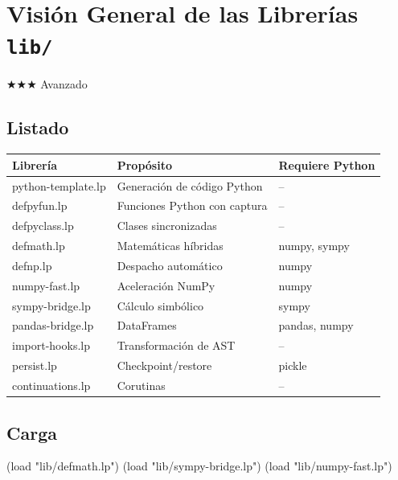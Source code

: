 \chapter{Visión General de las Librerías \texttt{lib/}}
\label{chap:libs}
{\huge$\bigstar$}{\huge$\bigstar$}{\huge$\bigstar$} Avanzado

\section{Listado}
\begin{center}
\begin{tabular}{lll}
\toprule
Librería & Propósito & Requiere Python \\
\midrule
python-template.lp & Generación de código Python & -- \\
defpyfun.lp & Funciones Python con captura & -- \\
defpyclass.lp & Clases sincronizadas & -- \\
defmath.lp & Matemáticas híbridas & numpy, sympy \\
defnp.lp & Despacho automático & numpy \\
numpy-fast.lp & Aceleración NumPy & numpy \\
sympy-bridge.lp & Cálculo simbólico & sympy \\
pandas-bridge.lp & DataFrames & pandas, numpy \\
import-hooks.lp & Transformación de AST & -- \\
persist.lp & Checkpoint/restore & pickle \\
continuations.lp & Corutinas & -- \\
\bottomrule
\end{tabular}
\end{center}

\section{Carga}
\begin{lispcode}
(load "lib/defmath.lp")
(load "lib/sympy-bridge.lp")
(load "lib/numpy-fast.lp")
\end{lispcode}

